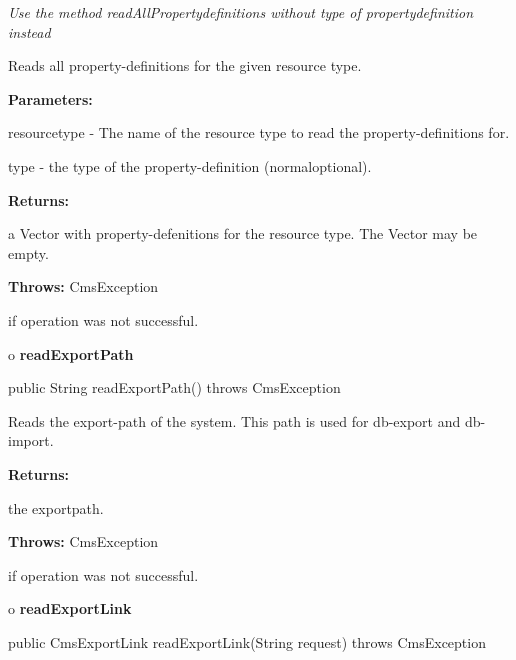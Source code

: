 \begin{description}
 {\it Use the
method readAllPropertydefinitions without type of propertydefinition instead} 

Reads all property-definitions for the given resource type. 

\begin{description}
\item {\bf Parameters:}  

resourcetype - The name of the resource type to read the property-definitions
for.  

type - the type of the property-definition (normal{\htmlBar}optional).  
\item {\bf Returns:}  

a Vector with property-defenitions for the resource type. The Vector may be
empty.  
\item {\bf Throws:} CmsException  

if operation was not successful.  
\end{description}

\end{description}

o {\bf readExportPath} 

\begin{PRE}
 public String readExportPath() throws CmsException
\end{PRE}

\begin{description}
\htmlDD Reads the export-path of the system. This path is used for db-export
and db-import. 

\begin{description}
\item {\bf Returns:}  

the exportpath.  
\item {\bf Throws:} CmsException  

if operation was not successful.  
\end{description}

\end{description}

o {\bf readExportLink} 

\begin{PRE}
 public CmsExportLink readExportLink(String request) throws CmsException
\end{PRE}

